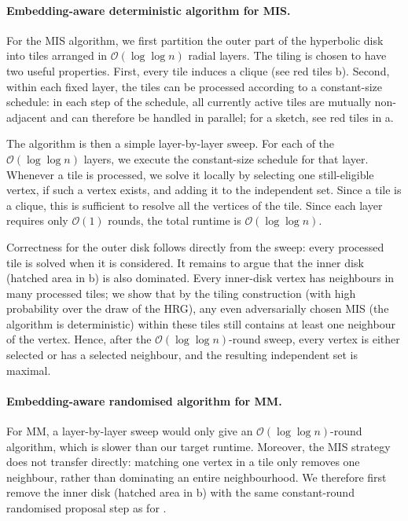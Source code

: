 \documentclass[letterpaper,11pt]{article}
\newcommand{\1}{\mathbb I}
\newcommand{\bigO}{\mathcal{O}}
\begin{document}
\paragraph{Embedding-aware deterministic algorithm for MIS.}
For the MIS algorithm, we first partition the outer part of the hyperbolic disk into tiles arranged in $\bigO(\log\log n)$ radial layers. The tiling is chosen to have two useful properties. First, every tile induces a clique (see red tiles b). Second, within each fixed layer, the tiles can be processed according to a constant-size schedule: in each step of the schedule, all currently active tiles are mutually non-adjacent and can therefore be handled in parallel; for a sketch, see red tiles in a.

The algorithm is then a simple layer-by-layer sweep. For each of the $\bigO(\log\log n)$ layers, we execute the constant-size schedule for that layer. Whenever a tile is processed, we solve it locally by selecting one still-eligible vertex, if such a vertex exists, and adding it to the independent set. Since a tile is a clique, this is sufficient to resolve all the vertices of the tile. Since each layer requires only $\bigO(1)$ rounds, the total runtime is $\bigO(\log\log n)$.

Correctness for the outer disk follows directly from the sweep: every processed tile is solved when it is considered. It remains to argue that the inner disk (hatched area in b) is also dominated. Every inner-disk vertex has neighbours in many processed tiles; we show that by the tiling construction (with high probability over the draw of the HRG), any even adversarially chosen MIS (the algorithm is deterministic) within these tiles still contains at least one neighbour of the vertex. Hence, after the $\bigO(\log\log n)$-round sweep, every vertex is either selected or has a selected neighbour, and the resulting independent set is maximal.

\paragraph{Embedding-aware randomised algorithm for MM.}
For MM, a layer-by-layer sweep would only give an $\bigO(\log\log n)$-round algorithm, which is slower than our target runtime. Moreover, the MIS strategy does not transfer directly: matching one vertex in a tile only removes one neighbour, rather than dominating an entire neighbourhood. We therefore first remove the inner disk (hatched area in b) with the same constant-round randomised proposal step as for .
\end{document}
